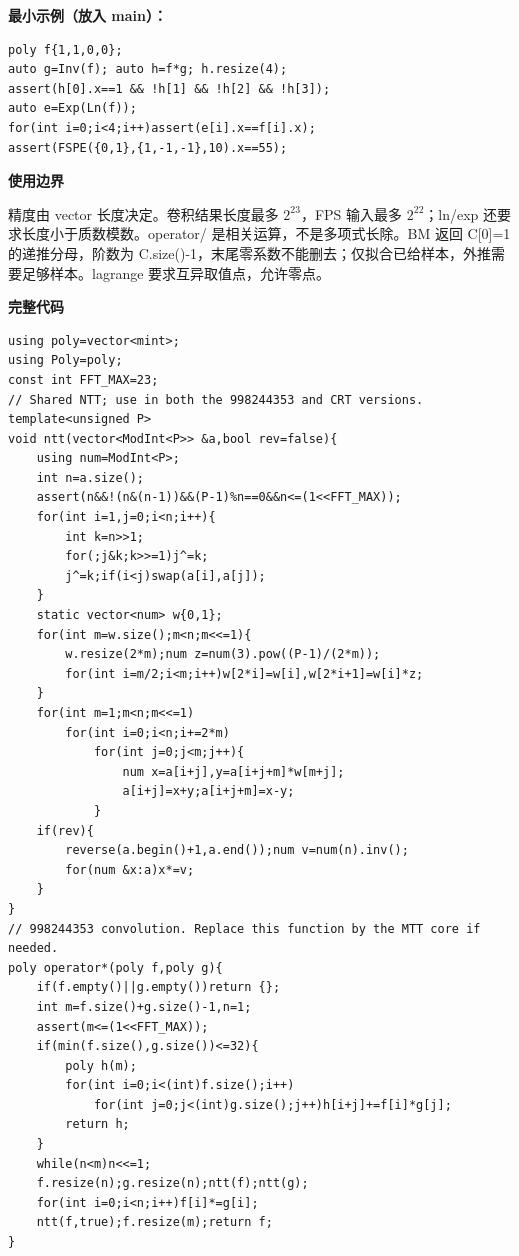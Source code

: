 \documentclass[UTF8,a4paper,10pt]{ctexart}
\newcommand{\TemplNote}[1]{\textbf{使用边界}\par #1\par}
\begin{document}
\textbf{最小示例（放入 main）：}
\begin{lstlisting}
poly f{1,1,0,0};
auto g=Inv(f); auto h=f*g; h.resize(4);
assert(h[0].x==1 && !h[1] && !h[2] && !h[3]);
auto e=Exp(Ln(f));
for(int i=0;i<4;i++)assert(e[i].x==f[i].x);
assert(FSPE({0,1},{1,-1,-1},10).x==55);
\end{lstlisting}
\TemplNote{精度由 vector 长度决定。卷积结果长度最多 $2^{23}$，FPS 输入最多 $2^{22}$；ln/exp 还要求长度小于质数模数。operator/ 是相关运算，不是多项式长除。BM 返回 C[0]=1 的递推分母，阶数为 C.size()-1，末尾零系数不能删去；仅拟合已给样本，外推需要足够样本。lagrange 要求互异取值点，允许零点。}
\textbf{完整代码}
\begin{lstlisting}[firstnumber=1]
using poly=vector<mint>;
using Poly=poly;
const int FFT_MAX=23;
// Shared NTT; use in both the 998244353 and CRT versions.
template<unsigned P>
void ntt(vector<ModInt<P>> &a,bool rev=false){
	using num=ModInt<P>;
	int n=a.size();
	assert(n&&!(n&(n-1))&&(P-1)%n==0&&n<=(1<<FFT_MAX));
	for(int i=1,j=0;i<n;i++){
		int k=n>>1;
		for(;j&k;k>>=1)j^=k;
		j^=k;if(i<j)swap(a[i],a[j]);
	}
	static vector<num> w{0,1};
	for(int m=w.size();m<n;m<<=1){
		w.resize(2*m);num z=num(3).pow((P-1)/(2*m));
		for(int i=m/2;i<m;i++)w[2*i]=w[i],w[2*i+1]=w[i]*z;
	}
	for(int m=1;m<n;m<<=1)
		for(int i=0;i<n;i+=2*m)
			for(int j=0;j<m;j++){
				num x=a[i+j],y=a[i+j+m]*w[m+j];
				a[i+j]=x+y;a[i+j+m]=x-y;
			}
	if(rev){
		reverse(a.begin()+1,a.end());num v=num(n).inv();
		for(num &x:a)x*=v;
	}
}
// 998244353 convolution. Replace this function by the MTT core if needed.
poly operator*(poly f,poly g){
	if(f.empty()||g.empty())return {};
	int m=f.size()+g.size()-1,n=1;
	assert(m<=(1<<FFT_MAX));
	if(min(f.size(),g.size())<=32){
		poly h(m);
		for(int i=0;i<(int)f.size();i++)
			for(int j=0;j<(int)g.size();j++)h[i+j]+=f[i]*g[j];
		return h;
	}
	while(n<m)n<<=1;
	f.resize(n);g.resize(n);ntt(f);ntt(g);
	for(int i=0;i<n;i++)f[i]*=g[i];
	ntt(f,true);f.resize(m);return f;
}


\end{lstlisting}
\end{document}
